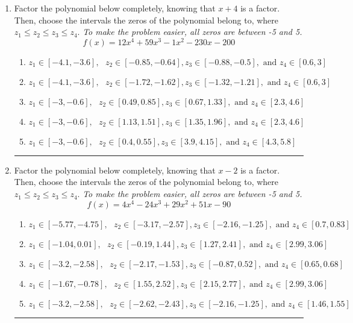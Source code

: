 \documentclass[14pt]{extbook}
\newcommand{\litem}[1]{\item#1\hspace*{-1cm}\rule{\textwidth}{0.4pt}}
\begin{document}
\begin{enumerate}
{\begin{enumerate}[label=\Alph*.]
\end{enumerate} }
\litem{
Factor the polynomial below completely, knowing that $x + 4$ is a factor. Then, choose the intervals the zeros of the polynomial belong to, where $z_1 \leq z_2 \leq z_3 \leq z_4$. \textit{To make the problem easier, all zeros are between -5 and 5.}\[ f(x) = 12x^{4} +59 x^{3} -1 x^{2} -230 x -200 \]\begin{enumerate}[label=\Alph*.]
\item \( z_1 \in [-4.1, -3.6], \text{   }  z_2 \in [-0.85, -0.64], z_3 \in [-0.88, -0.5], \text{   and   } z_4 \in [0.6, 3] \)
\item \( z_1 \in [-4.1, -3.6], \text{   }  z_2 \in [-1.72, -1.62], z_3 \in [-1.32, -1.21], \text{   and   } z_4 \in [0.6, 3] \)
\item \( z_1 \in [-3, -0.6], \text{   }  z_2 \in [0.49, 0.85], z_3 \in [0.67, 1.33], \text{   and   } z_4 \in [2.3, 4.6] \)
\item \( z_1 \in [-3, -0.6], \text{   }  z_2 \in [1.13, 1.51], z_3 \in [1.35, 1.96], \text{   and   } z_4 \in [2.3, 4.6] \)
\item \( z_1 \in [-3, -0.6], \text{   }  z_2 \in [0.4, 0.55], z_3 \in [3.9, 4.15], \text{   and   } z_4 \in [4.3, 5.8] \)

\end{enumerate} }
\litem{
Factor the polynomial below completely, knowing that $x -2$ is a factor. Then, choose the intervals the zeros of the polynomial belong to, where $z_1 \leq z_2 \leq z_3 \leq z_4$. \textit{To make the problem easier, all zeros are between -5 and 5.}\[ f(x) = 4x^{4} -24 x^{3} +29 x^{2} +51 x -90 \]\begin{enumerate}[label=\Alph*.]
\item \( z_1 \in [-5.77, -4.75], \text{   }  z_2 \in [-3.17, -2.57], z_3 \in [-2.16, -1.25], \text{   and   } z_4 \in [0.7, 0.83] \)
\item \( z_1 \in [-1.04, 0.01], \text{   }  z_2 \in [-0.19, 1.44], z_3 \in [1.27, 2.41], \text{   and   } z_4 \in [2.99, 3.06] \)
\item \( z_1 \in [-3.2, -2.58], \text{   }  z_2 \in [-2.17, -1.53], z_3 \in [-0.87, 0.52], \text{   and   } z_4 \in [0.65, 0.68] \)
\item \( z_1 \in [-1.67, -0.78], \text{   }  z_2 \in [1.55, 2.52], z_3 \in [2.15, 2.77], \text{   and   } z_4 \in [2.99, 3.06] \)
\item \( z_1 \in [-3.2, -2.58], \text{   }  z_2 \in [-2.62, -2.43], z_3 \in [-2.16, -1.25], \text{   and   } z_4 \in [1.46, 1.55] \)


\end{enumerate}}
\end{enumerate}
\end{document}
